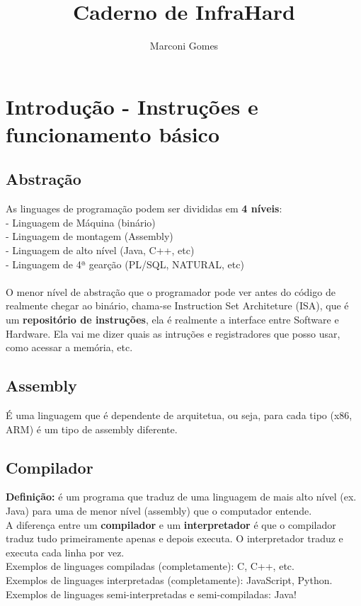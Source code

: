 \documentclass[12pt]{article}
\begin{document}
\nocite{*}

\title{Caderno de InfraHard}
\author{Marconi Gomes}

\maketitle


\section{Introdução - Instruções e funcionamento básico}
    \subsection{Abstração}
    As linguages de programação podem ser divididas em \textbf{4 níveis}:
    \\- Linguagem de Máquina (binário)
    \\- Linguagem de montagem (Assembly)
    \\- Linguagem de alto nível (Java, C++, etc)
    \\- Linguagem de 4ª gearção (PL/SQL, NATURAL, etc)
    \\~\\O menor nível de abstração que o programador pode ver antes do código de realmente chegar ao binário, chama-se Instruction Set Architeture (ISA), que é um \textbf{repositório de instruções}, ela é realmente a interface entre Software e Hardware. Ela vai me dizer quais as intruções e registradores que posso usar, como acessar a memória, etc.

    \subsection{Assembly}
    É uma linguagem que é dependente de arquitetua, ou seja, para cada tipo (x86, ARM) é um tipo de assembly diferente.

    \subsection{Compilador}
    \textbf{Definição:} é um programa que traduz de uma linguagem de mais alto nível (ex. Java) para uma de menor nível (assembly) que o computador entende.
    \\A diferença entre um \textbf{compilador} e um \textbf{interpretador} é que o compilador traduz tudo primeiramente apenas e depois executa. O interpretador traduz e executa cada linha por vez. 
    \\Exemplos de linguages compiladas (completamente): C, C++, etc.
    \\Exemplos de linguages interpretadas (completamente): JavaScript, Python.
    \\Exemplos de linguages semi-interpretadas e semi-compiladas: Java!
\end{document}
